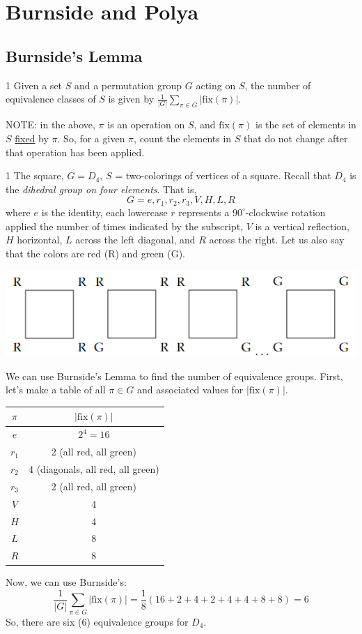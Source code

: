 \label{34-0430}
\section{Burnside and Polya}

\subsection{Burnside's Lemma}
\begin{lemma}1
    Given a set $S$ and a permutation group $G$ acting on $S$, the number of 
    equivalence classes of $S$ is given by $\frac 1{|G|}\sum_{\pi \in G}|\mathrm{fix}(\pi)|$. 
\end{lemma}
NOTE: in the above, $\pi$ is an operation on $S$, and $\mathrm{fix}(\pi)$ is the 
set of elements in $S$ \underline{fixed} by $\pi$. So, for a given $\pi$, count the 
elements in $S$ that do not change after that operation has been applied. 

\begin{example}1
    The square, $G = D_4$, $S$ = two-colorings of vertices of a square.
    Recall that $D_4$ is the \textit{dihedral group on four elements}. That is, 
    \[ G = e, r_1, r_2, r_3, V, H, L, R \]
    where $e$ is the identity, each lowercase $r$ represents a $90^\circ$-clockwise rotation
applied the number of times indicated by the subscript, $V$ is a vertical reflection,
 $H$ horizontal, $L$ across the left diagonal, and $R$ across the right. Let
us also say that the colors are red (R) and green (G).
\begin{center}
    \includegraphics[scale=1]{figures/sqaure_colorings.png}
\end{center}
We can use Burnside's Lemma to find the number of equivalence groups. First,
let's make a table of all $\pi \in G$ and associated values for $|\mathrm{fix}(\pi)|$.
\begin{center}
    \begin{tabular}{c|c}
        $\pi$ & $|\mathrm{fix}(\pi)|$ \\ \hline
        $e$ & $2^4 = 16$ \\
        $r_1$ & 2 (all red, all green) \\
        $r_2$ & 4 (diagonals, all red, all green) \\
        $r_3$ & 2 (all red, all green) \\
        $V$ & 4 \\
        $H$ & 4 \\ 
        $L$ & 8 \\
        $R$ & 8 
    \end{tabular}
\end{center}
Now, we can use Burnside's: 
\[
    \frac 1{|G|}\sum_{\pi \in G}|\mathrm{fix}(\pi)| = 
    \frac 18 (16 + 2 + 4 + 2 + 4 + 4 + 8 + 8) = \boxed 6
\]
So, there are six (6) equivalence groups for $D_4$. 
\end{example}

